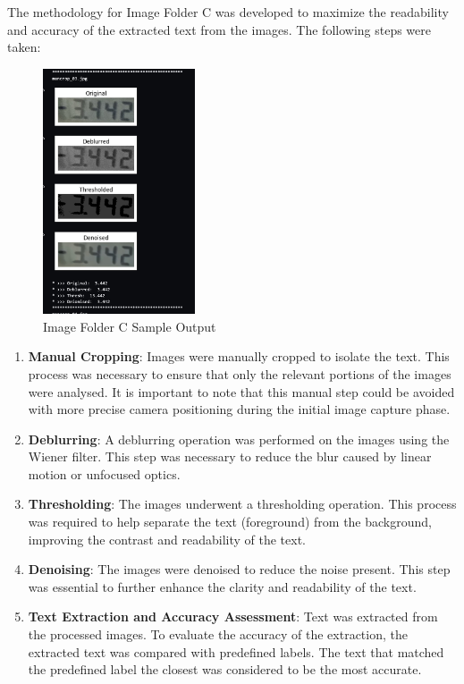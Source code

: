 The methodology for Image Folder C was developed to maximize the readability and accuracy of the extracted text from the images. The following steps were taken:

\begin{figure}[ht]
    \centering
    \includegraphics[width=0.4\textwidth]{Figures/Methodology/sipa_04/result_sample.jpg}
    \caption[Image Folder C Sample Output]{Image Folder C Sample Output}
    \label{fig:Image Folder C Sample Output}
\end{figure}


\begin{enumerate}
    \item \textbf{Manual Cropping}: Images were manually cropped to isolate the text. This process was necessary to ensure that only the relevant portions of the images were analysed. It is important to note that this manual step could be avoided with more precise camera positioning during the initial image capture phase.
    \item \textbf{Deblurring}: A deblurring operation was performed on the images using the Wiener filter. This step was necessary to reduce the blur caused by linear motion or unfocused optics.
    \item \textbf{Thresholding}: The images underwent a thresholding operation. This process was required to help separate the text (foreground) from the background, improving the contrast and readability of the text.
    \item \textbf{Denoising}: The images were denoised to reduce the noise present. This step was essential to further enhance the clarity and readability of the text.
    \item \textbf{Text Extraction and Accuracy Assessment}: Text was extracted from the processed images. To evaluate the accuracy of the extraction, the extracted text was compared with predefined labels. The text that matched the predefined label the closest was considered to be the most accurate.
\end{enumerate}


